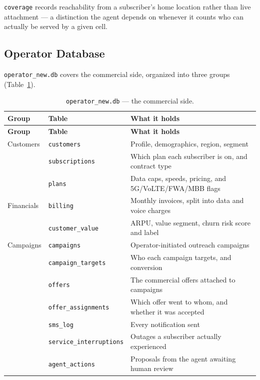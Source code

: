 \texttt{coverage} records reachability from a subscriber's home location rather
than live attachment --- a distinction the agent depends on whenever it counts
who can actually be served by a given cell.

\subsection{Operator Database}

\texttt{operator\_new.db} covers the commercial side, organized into three
groups (Table~\ref{tab:schema-operator}).

\begin{longtable}{@{}p{2.1cm}p{3.5cm}p{8.2cm}@{}}
\caption{\texttt{operator\_new.db} --- the commercial
side.}\label{tab:schema-operator}\\
\toprule
\textbf{Group} & \textbf{Table} & \textbf{What it holds} \\
\midrule
\endfirsthead
\toprule
\textbf{Group} & \textbf{Table} & \textbf{What it holds} \\
\midrule
\endhead
Customers & \texttt{customers} & Profile, demographics, region, segment \\
 & \texttt{subscriptions} & Which plan each subscriber is on, and contract type \\
 & \texttt{plans} & Data caps, speeds, pricing, and 5G/VoLTE/FWA/MBB flags \\
\addlinespace
Financials & \texttt{billing} & Monthly invoices, split into data and voice charges \\
 & \texttt{customer\_value} & ARPU, value segment, churn risk score and label \\
\addlinespace
Campaigns & \texttt{campaigns} & Operator-initiated outreach campaigns \\
 & \texttt{campaign\_targets} & Who each campaign targets, and conversion \\
 & \texttt{offers} & The commercial offers attached to campaigns \\
 & \texttt{offer\_assignments} & Which offer went to whom, and whether it was accepted \\
 & \texttt{sms\_log} & Every notification sent \\
 & \texttt{service\_interruptions} & Outages a subscriber actually experienced \\
 & \texttt{agent\_actions} & Proposals from the agent awaiting human review \\
\bottomrule
\end{longtable}

